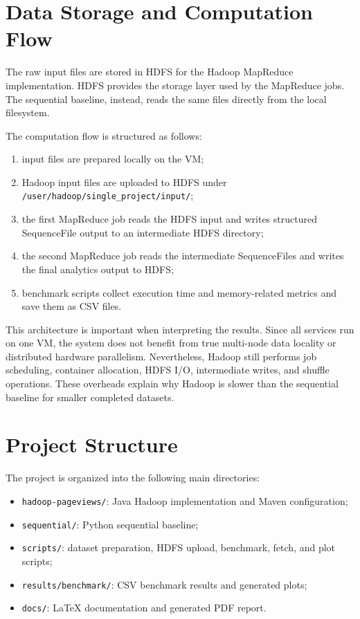 \documentclass[12pt,a4paper]{report}
\begin{document}
\section{Data Storage and Computation Flow}

The raw input files are stored in HDFS for the Hadoop MapReduce implementation. HDFS provides the storage layer used by the MapReduce jobs. The sequential baseline, instead, reads the same files directly from the local filesystem.

The computation flow is structured as follows:

\begin{enumerate}
    \item input files are prepared locally on the VM;
    \item Hadoop input files are uploaded to HDFS under \texttt{/user/hadoop/single\_project/input/};
    \item the first MapReduce job reads the HDFS input and writes structured SequenceFile output to an intermediate HDFS directory;
    \item the second MapReduce job reads the intermediate SequenceFiles and writes the final analytics output to HDFS;
    \item benchmark scripts collect execution time and memory-related metrics and save them as CSV files.
\end{enumerate}

This architecture is important when interpreting the results. Since all services run on one VM, the system does not benefit from true multi-node data locality or distributed hardware parallelism. Nevertheless, Hadoop still performs job scheduling, container allocation, HDFS I/O, intermediate writes, and shuffle operations. These overheads explain why Hadoop is slower than the sequential baseline for smaller completed datasets.

\section{Project Structure}

The project is organized into the following main directories:

\begin{itemize}
    \item \texttt{hadoop-pageviews/}: Java Hadoop implementation and Maven configuration;
    \item \texttt{sequential/}: Python sequential baseline;
    \item \texttt{scripts/}: dataset preparation, HDFS upload, benchmark, fetch, and plot scripts;
    \item \texttt{results/benchmark/}: CSV benchmark results and generated plots;
    \item \texttt{docs/}: LaTeX documentation and generated PDF report.
\end{itemize}
\end{document}
